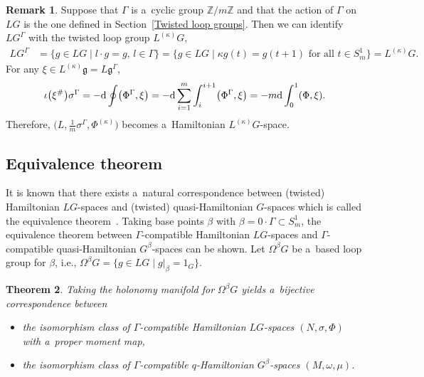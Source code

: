 \documentclass[10pt,a4paper]{amsart}
\numberwithin{equation}{section}
\newtheorem{Theorem}{Theorem}[section]
\theoremstyle{definition}
\newtheorem{Remark}[Theorem]{Remark}
\newcommand{\bZ}{\mathbb{Z}}
\begin{document}
\begin{Remark}Suppose that $\Gamma$ is a~cyclic group $\bZ/m\bZ$ and that the action of $\Gamma$ on $LG$ is the one defined in Section~\ref{Twisted loop groups}.
 Then we can identify $LG^{\Gamma}$ with the twisted loop group $L^{(\kappa)}G$,
\begin{align*}
 LG^{\Gamma} &= \{g \in LG\mid l\cdot g = g,\, l \in \Gamma\} = \bigl\{g \in LG\mid \kappa g(t) =g(t+1) \text{ for all }t \in S^1_m\bigr\}
 = L^{(\kappa)}G.
\end{align*}
For any $\xi \in L^{(\kappa)}\mathfrak{g} = L\mathfrak{g}^{\Gamma}$,
\begin{align*}
 \iota\bigl(\xi^{\#}\bigr)\sigma^{\Gamma}
 = -{\rm d} \oint \bigl(\Phi^{\Gamma}, \xi\bigr) = -{\rm d} \sum_{i=1}^{m} \int_{i}^{i+1} \bigl(\Phi^{\Gamma}, \xi\bigr)
 = -m{\rm d} \int_{0}^{1} (\Phi,\xi).
\end{align*}
Therefore, $\big(L, \frac{1}{m}\sigma^{\Gamma}, \Phi^{(\kappa)}\big)$ becomes a~Hamiltonian $L^{(\kappa)}G$-space.
\end{Remark}

\subsection{Equivalence theorem}
It is known that there exists a~natural correspondence between (twisted) Hamiltonian $LG$-spaces and (twisted) quasi-Hamiltonian $G$-spaces
which is called the equivalence theorem~\cite{AMM,LYM_twisted_LG,Meinrenken2017}.
Taking base points $\beta$ with $\beta = 0 \cdot \Gamma \subset S^{1}_m$, the equivalence theorem between $\Gamma$-compatible Hamiltonian $LG$-spaces and $\Gamma$-compatible quasi-Hamiltonian $G^{\beta}$-spaces can be shown.
Let $\Omega^{\beta}G$ be a~based loop group for $\beta $, i.e., $\Omega ^{\beta}G = \{g \in LG\mid g|_{\beta} = 1_G\}$.

\begin{Theorem}\label{equiv thm}
Taking the holonomy manifold for $\Omega^{\beta}G$ yields a~bijective correspondence between
\begin{itemize}\itemsep=0pt
 \item the isomorphism class of $\Gamma$-compatible Hamiltonian $LG$-spaces $(N,\sigma,\Phi)$ with a~proper moment map,
 \item the isomorphism class of $\Gamma$-compatible $q$-Hamiltonian $G^{\beta}$-spaces $(M,\omega,\mu)$.
\end{itemize}
\end{Theorem}
\end{document}
